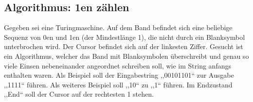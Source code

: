 \subsection{Algorithmus: 1en zählen}
%
Gegeben sei eine Turingmaschine. Auf dem Band befindet sich eine beliebige Sequenz von 0en und 1en (der Mindestlänge 1), die nicht durch ein Blanksymbol unterbrochen wird. Der Cursor befindet sich auf der linkesten Ziffer. Gesucht ist ein Algorithmus, welcher das Band mit Blanksymbolen überschreibt und genau so viele Einsen nebeneinander angeordnet schreiben soll, wie im String anfangs enthalten waren. Als Beispiel soll der Eingabestring ,,00101101`` zur Ausgabe ,,1111`` führen. Als weiteres Beispiel soll ,,10`` zu ,,1`` führen. Im Endzustand ,,End`` soll der Cursor auf der rechtesten 1 stehen.

